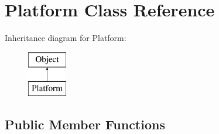 \hypertarget{class_platform}{}\section{Platform Class Reference}
\label{class_platform}
Inheritance diagram for Platform\+:\begin{figure}[H]
\begin{center}
\leavevmode
\includegraphics[height=2.000000cm]{class_platform}
\end{center}
\end{figure}
\subsection*{Public Member Functions}

